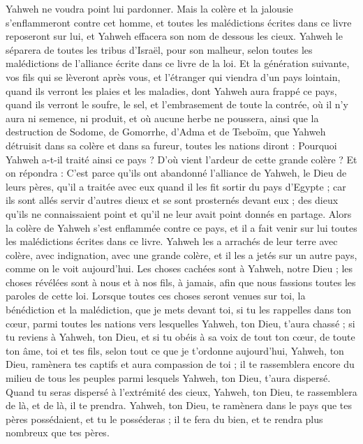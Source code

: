 \begin{multicols}{2}
Yahweh ne voudra point lui pardonner. Mais la colère et la jalousie s'enflammeront contre cet homme, et toutes les malédictions écrites dans ce livre reposeront sur lui, et Yahweh effacera son nom de dessous les cieux.
Yahweh le séparera de toutes les tribus d'Israël, pour son malheur, selon toutes les malédictions de l'alliance écrite dans ce livre de la loi.
Et la génération suivante, vos fils qui se lèveront après vous, et l’étranger qui viendra d'un pays lointain, quand ils verront les plaies et les maladies, dont Yahweh aura frappé ce pays,
quand ils verront le soufre, le sel, et l’embrasement de toute la contrée, où il n’y aura ni semence, ni produit, et où aucune herbe ne poussera, ainsi que la destruction de Sodome, de Gomorrhe, d'Adma et de Tseboïm, que Yahweh détruisit dans sa colère et dans sa fureur,
toutes les nations diront : Pourquoi Yahweh a-t-il traité ainsi ce pays ? D’où vient l’ardeur de cette grande colère ?
Et on répondra : C'est parce qu'ils ont abandonné l'alliance de Yahweh, le Dieu de leurs pères, qu’il a traitée avec eux quand il les fit sortir du pays d'Egypte ;
car ils sont allés servir d'autres dieux et se sont prosternés devant eux ; des dieux qu'ils ne connaissaient point et qu’il ne leur avait point donnés en partage.
Alors la colère de Yahweh s'est enflammée contre ce pays, et il a fait venir sur lui toutes les malédictions écrites dans ce livre.
Yahweh les a arrachés de leur terre avec colère, avec indignation, avec une grande colère, et il les a jetés sur un autre pays, comme on le voit aujourd'hui.
Les choses cachées sont à Yahweh, notre Dieu ; les choses révélées sont à nous et à nos fils, à jamais, afin que nous fassions toutes les paroles de cette loi.
\VerseOne{}Lorsque toutes ces choses seront venues sur toi, la bénédiction et la malédiction, que je mets devant toi, si tu les rappelles dans ton cœur, parmi toutes les nations vers lesquelles Yahweh, ton Dieu, t'aura chassé ;
si tu reviens à Yahweh, ton Dieu, et si tu obéis à sa voix de tout ton cœur, de toute ton âme, toi et tes fils, selon tout ce que je t’ordonne aujourd’hui,
Yahweh, ton Dieu, ramènera tes captifs et aura compassion de toi ; il te rassemblera encore du milieu de tous les peuples parmi lesquels Yahweh, ton Dieu, t'aura dispersé.
Quand tu seras dispersé à l’extrémité des cieux, Yahweh, ton Dieu, te rassemblera de là, et de là, il te prendra.
Yahweh, ton Dieu, te ramènera dans le pays que tes pères possédaient, et tu le posséderas ; il te fera du bien, et te rendra plus nombreux que tes pères.

\end{multicols}
